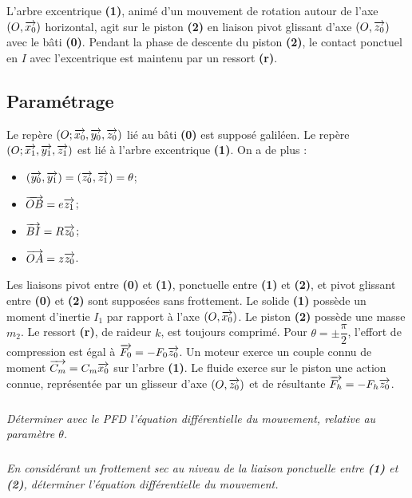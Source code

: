 \documentclass[10pt,fleqn]{article} %
\begin{document}
\begin{multicols}{2}
L'arbre excentrique \textbf{(1)}, animé d'un mouvement de rotation autour de l'axe $\left(O,\overrightarrow{x_0}\right)$  horizontal, agit sur le piston \textbf{(2)} en liaison pivot glissant d'axe $\left(O,\overrightarrow{z_0}\right)$ avec le bâti \textbf{(0)}. Pendant la phase de descente du piston \textbf{(2)}, le contact ponctuel en $I$ avec l’excentrique est maintenu par un ressort \textbf{(r)}.

\subsection*{Paramétrage}
Le repère $\left(O;\overrightarrow{x_0},\overrightarrow{y_0},\overrightarrow{z_0} \right)$ lié au bâti \textbf{(0)} est supposé galiléen.
Le repère $\left(O;\overrightarrow{x_1},\overrightarrow{y_1},\overrightarrow{z_1} \right)$ est lié à l'arbre excentrique \textbf{(1)}.
On a de plus :
\begin{itemize}
\item $\left(\overrightarrow{y_0},\overrightarrow{y_1}\right)=\left(\overrightarrow{z_0},\overrightarrow{z_1}\right)=\theta$;
\item $\overrightarrow{OB}=e\overrightarrow{z_1}$;
\item $\overrightarrow{BI}=R\overrightarrow{z_0}$;
\item $\overrightarrow{OA}=z\overrightarrow{z_0}$. 
\end{itemize} 	 	 		 
Les liaisons pivot entre \textbf{(0)} et \textbf{(1)}, ponctuelle entre \textbf{(1)} et \textbf{(2)}, et pivot glissant entre \textbf{(0)} et \textbf{(2)} sont supposées sans frottement.
Le solide \textbf{(1)} possède un moment d’inertie $I_1$ par rapport à l'axe $\left(O,\overrightarrow{x_0}\right)$. Le piston \textbf{(2)} possède une masse $m_2$.
Le ressort \textbf{(r)}, de raideur $k$, est toujours comprimé. Pour $\theta = \pm \dfrac{\pi}{2}$, l'effort de compression est égal à $\overrightarrow{F_0}=-F_0\overrightarrow{z_0}$.
Un moteur exerce un couple connu de moment $\overrightarrow{C_m}=C_m\overrightarrow{x_0}$ sur l'arbre \textbf{(1)}. Le fluide exerce sur le piston une action connue, représentée par un glisseur d'axe $\left(O,\overrightarrow{z_0}\right)$ et de résultante $\overrightarrow{F_h}=-F_h{\overrightarrow{z_0}}$.

\subparagraph{}\textit{Déterminer avec le PFD l'équation différentielle du mouvement, relative au paramètre $\theta$.}


\subparagraph{}\textit{En considérant un frottement sec au niveau de la liaison ponctuelle entre \textbf{(1)} et \textbf{(2)}, déterminer l'équation différentielle du mouvement.}


\ifprof
\else
\end{multicols}
\fi
\end{document}

